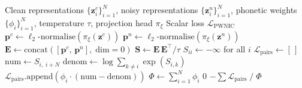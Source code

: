 \documentclass[12pt,a4paper]{report}
\newcommand{\PWNIC}{\mathcal{L}_{\mathrm{PWNIC}}}
\begin{document}
\begin{algorithm}[H]
\caption{PWNIC Loss Computation}
\label{alg:pwnic}
\begin{algorithmic}[1]
\Require Clean representations $\{\mathbf{z}_i^c\}_{i=1}^N$, noisy representations $\{\mathbf{z}_i^n\}_{i=1}^N$, phonetic weights $\{\phi_i\}_{i=1}^N$, temperature $\tau$, projection head $\pi_\xi$
\Ensure Scalar loss $\PWNIC$
\State $\mathbf{p}^c \leftarrow \ell_2\text{-normalise}(\pi_\xi(\mathbf{z}^c))$ 
\State $\mathbf{p}^n \leftarrow \ell_2\text{-normalise}(\pi_\xi(\mathbf{z}^n))$ \Comment{$[N \times 256]$}
\State $\mathbf{E} \leftarrow \mathrm{concat}([\mathbf{p}^c,\, \mathbf{p}^n],\; \mathrm{dim}{=}0)$ \Comment{$[2N \times 256]$}
\State $\mathbf{S} \leftarrow \mathbf{E}\,\mathbf{E}^\top / \tau$ 
\State $S_{ii} \leftarrow -\infty$ for all $i$ 
\State $\mathcal{L}_{\text{pairs}} \leftarrow [\,]$
  \State $\text{num} \leftarrow S_{i,\; i+N}$ 
  \State $\text{denom} \leftarrow \log\sum_{k \neq i} \exp(S_{i,k})$ 
  \State $\mathcal{L}_{\text{pairs}}.\text{append}\!\left(\phi_i \cdot (\text{num} - \text{denom})\right)$
\EndFor
\State $\Phi \leftarrow \sum_{i=1}^N \phi_i$
\If{$\Phi < \varepsilon$} \Return $0$ \EndIf {}
\State \Return $-\sum \mathcal{L}_{\text{pairs}}\; /\; \Phi$ 
\end{algorithmic}
\end{algorithm}
\end{document}
